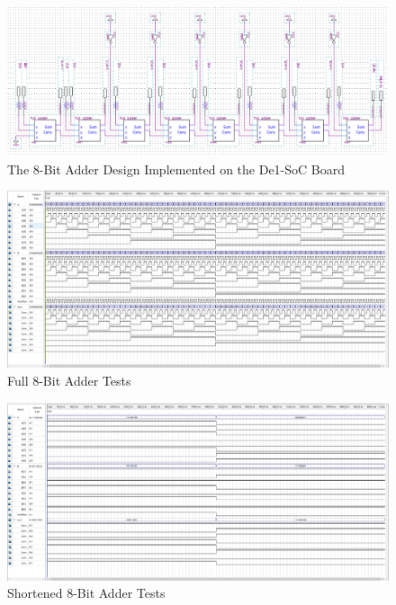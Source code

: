 \documentclass[
	letterpaper, %
	10pt, %
]{CSUniSchoolLabReport}
\begin{document}
\begin{figure}[h!]
  \centering
  \includegraphics[width=.9\textwidth]{Figures/8BAdderForBoard.png}
  \caption{The 8-Bit Adder Design Implemented on the De1-SoC Board}
  \label{fig:9}
\end{figure}

\begin{figure}[h!]
  \centering
  \includegraphics[width=.9\textwidth]{Figures/8BSimFull.png}
  \caption{Full 8-Bit Adder Tests}
  \label{fig:10}
\end{figure}

\begin{figure}[h!]
  \centering
  \includegraphics[width=.9\textwidth]{Figures/8BSimShort.png}
  \caption{Shortened 8-Bit Adder Tests}
  \label{fig:11}
\end{figure}
\end{document}
